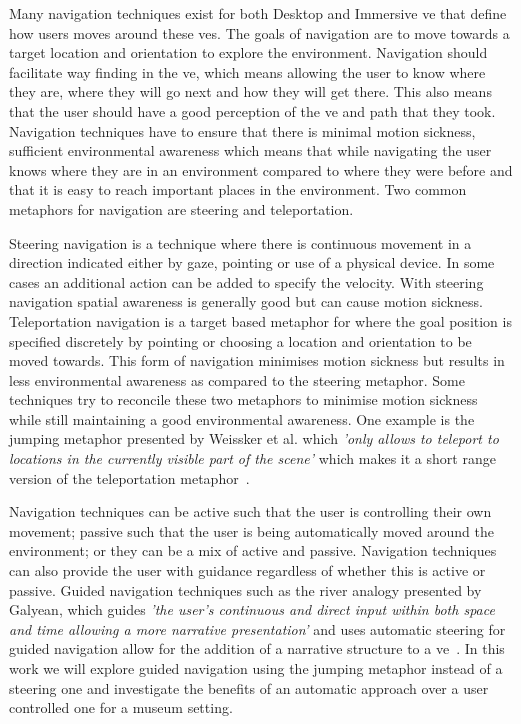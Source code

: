 \label{Chapter:Introduction}
Many navigation techniques exist for both Desktop and Immersive \acrfull{ve} that define how users moves around these \acrshort{ve}s. The goals of navigation are to move towards a target location and orientation to explore the environment. Navigation should facilitate way finding in the \acrshort{ve}, which means allowing the user to know where they are, where they will go next and how they will get there. This also means that the user should have a good perception of the \acrshort{ve} and path that they took. Navigation techniques have to ensure that there is minimal motion sickness, sufficient environmental awareness which means that while navigating the user knows where they are in an environment compared to where they were before and that it is easy to reach important places in the environment. Two common metaphors for navigation are steering and teleportation.

Steering navigation is a technique where there is continuous movement in a direction indicated either by gaze, pointing or use of a physical device. In some cases an additional action can be added to specify the velocity. With steering navigation spatial awareness is generally good but can cause motion sickness. Teleportation navigation is a target based metaphor for where the goal position is specified discretely by pointing or choosing a location and orientation to be moved towards. This form of navigation minimises motion sickness but results in less environmental awareness as compared to the steering metaphor. Some techniques try to reconcile these two metaphors to minimise motion sickness while still maintaining a good environmental awareness. One example is the jumping metaphor presented by Weissker et al. which \textit{'only allows to teleport to locations in the currently visible part of the scene'} which makes it a short range version of the teleportation metaphor~\cite{Weissker2018}. 

Navigation techniques can be active such that the user is controlling their own movement; passive such that the user is being automatically moved around the environment; or they can be a mix of active and passive. Navigation techniques can also provide the user with guidance regardless of whether this is active or passive. Guided navigation techniques such as the river analogy presented by Galyean, which guides \textit{'the user’s continuous and direct input within both space and time allowing a more narrative presentation'} and uses automatic steering for guided navigation allow for the addition of a narrative structure to a \acrshort{ve}~\cite{Galyean1995}. In this work we will explore guided navigation using the jumping metaphor instead of a steering one and investigate the benefits of an automatic approach over a user controlled one for a museum setting. 

